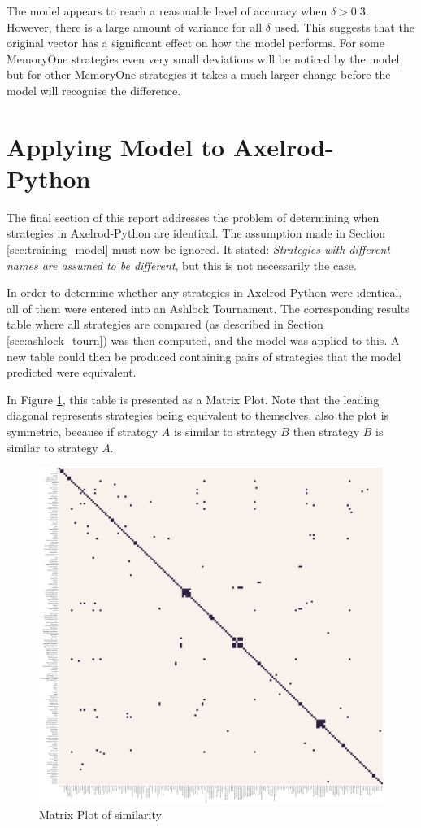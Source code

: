 The model appears to reach a reasonable level of accuracy when $\delta > 0.3$.
However, there is a large amount of variance for all $\delta$ used.
This suggests that the original vector has a significant effect on how the model performs.
For some MemoryOne strategies even very small deviations will be noticed by the model, but for other MemoryOne strategies it takes a much larger change before the model will recognise the difference.

\section{Applying Model to Axelrod-Python}

The final section of this report addresses the problem of determining when strategies in Axelrod-Python are identical.
The assumption made in Section \ref{sec:training_model} must now be ignored.
It stated: \textit{Strategies with different names are assumed to be different}, but this is not necessarily the case.

In order to determine whether any strategies in Axelrod-Python were identical, all of them were entered into an Ashlock Tournament.
The corresponding results table where all strategies are compared (as described in Section \ref{sec:ashlock_tourn}) was then computed, and the model was applied to this.
A new table could then be produced containing pairs of strategies that the model predicted were equivalent.

In Figure \ref{fig:matrix_similarity}, this table is presented as a Matrix Plot.
Note that the leading diagonal represents strategies being equivalent to themselves, also the plot is symmetric, because if strategy $A$ is similar to strategy $B$ then strategy $B$ is similar to strategy $A$.

\begin{figure}[htbp!]
    \centering
    \includegraphics[width=0.8\linewidth]{../img/ML/similarity_heatmap.png}
    \caption{Matrix Plot of similarity}
    \label{fig:matrix_similarity}
\end{figure}

